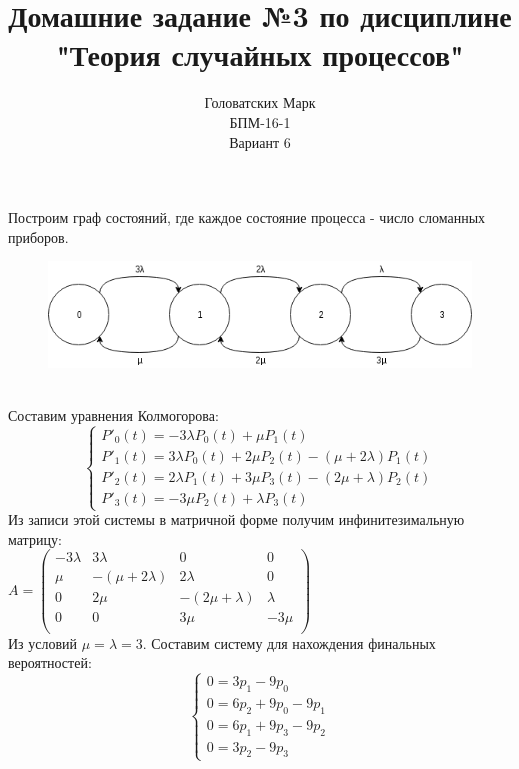 \documentclass [a4paper,12pt]{article}
\title{Домашние задание №3 по дисциплине "Теория случайных процессов"}
\author{Головатских Марк \\БПМ-16-1 \\ Вариант 6}
\date{}
\begin{document}
\maketitle
{}
\newpage
{}
Построим граф состояний, где каждое состояние процесса - число сломанных приборов.\\
\begin{figure}[h!]
  \includegraphics[width=\linewidth]{sphw3.png}
\end{figure}\\
Составим уравнения Колмогорова:\\
\begin{equation*}
\begin{cases}
  P'_0(t) = -3{\lambda}P_0(t) + {\mu}P_1(t)
  \\
  P'_1(t) = 3{\lambda}P_0(t) + 2{\mu}P_2(t) - (\mu + 2{\lambda})P_1(t)
  \\
  P'_2(t) = 2{\lambda}P_1(t) + 3{\mu}P_3(t) - (2{\mu} + \lambda)P_2(t)
  \\
  P'_3(t) = - 3{\mu}P_2(t) + {\lambda}P_3(t)
\end{cases}
\end{equation*}
Из записи этой системы в матричной форме получим инфинитезимальную матрицу:\\
$A = \left(
\begin{matrix}
-3{\lambda} & 3{\lambda} & 0 & 0\\
\mu & -({\mu} + 2{\lambda}) & 2{\lambda} & 0\\
0 & 2{\mu} & -(2{\mu} + \lambda) & \lambda \\
0 & 0 & 3{\mu} & -3{\mu} \\
\end{matrix}
\right) $\\
Из условий $\mu = \lambda = 3$. Составим систему для нахождения финальных вероятностей:\\
\begin{equation*}
\begin{cases}
0 = 3p_1 - 9p_0
\\
0 = 6p_2 + 9p_0 - 9p_1
\\
0 = 6p_1 + 9p_3 - 9p_2
\\
0 = 3p_2 - 9p_3
\end{cases}
\end{equation*}
\end{document}
